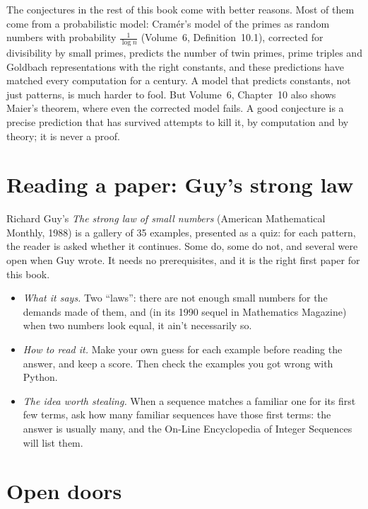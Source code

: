 The conjectures in the rest of this book come with better reasons. Most of them come from a probabilistic model: Cram\'er's model of the primes as random
numbers with probability $\frac1{\log n}$ (Volume~6, Definition~10.1), corrected for divisibility by small primes, predicts the number of twin primes, prime
triples and Goldbach representations with the right constants, and these predictions have matched every computation for a century. A model that predicts
constants, not just patterns, is much harder to fool. But Volume~6, Chapter~10 also shows Maier's theorem, where even the corrected model fails. A good
conjecture is a precise prediction that has survived attempts to kill it, by computation and by theory; it is never a proof.

\section{Reading a paper: Guy's strong law}

Richard Guy's \emph{The strong law of small numbers} (American Mathematical Monthly, 1988) is a gallery of 35 examples, presented as a quiz: for each pattern,
the reader is asked whether it continues. Some do, some do not, and several were open when Guy wrote. It needs no prerequisites, and it is the right first paper
for this book.
\begin{itemize}
\item \emph{What it says.} Two ``laws'': there are not enough small numbers for the demands made of them, and (in its 1990 sequel in Mathematics Magazine) when
two numbers look equal, it ain't necessarily so.
\item \emph{How to read it.} Make your own guess for each example before reading the answer, and keep a score. Then check the examples you got wrong with
Python.
\item \emph{The idea worth stealing.} When a sequence matches a familiar one for its first few terms, ask how many familiar sequences have those first terms:
the answer is usually many, and the On-Line Encyclopedia of Integer Sequences will list them.
\end{itemize}

\section{Open doors}

